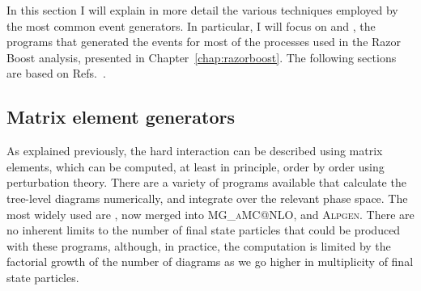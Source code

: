 

In this section I will explain in more detail the various techniques employed by the most common
event generators. In particular, I will focus on \MADGRAPH and \PYTHIA, the programs
that generated the events for most of the processes used in the Razor Boost analysis, presented in
Chapter~\ref{chap:razorboost}. 
The following sections are based on
Refs.~\cite{Campbell:2006wx,Salam:2010zt,Skands:2011pf,Buckley:2011ms,Sjostrand:2006za}. 

\subsection{Matrix element generators \label{sec:event_matrix_element_generators}}




As explained previously, the hard interaction can be described using matrix elements, which can be
computed, at least in principle, order by order using perturbation theory. 
There are a variety of programs available that calculate the tree-level diagrams numerically,
and integrate over the relevant phase space. The most widely used are \MADGRAPH, now merged
into \textsc{MG\_aMC@NLO}, and \textsc{Alpgen}. 
There are no inherent limits to the number of final state particles that could be produced with
these programs, although, in practice, the computation is limited by the factorial growth of the
number of diagrams as we go higher in multiplicity of final state particles. 
 


